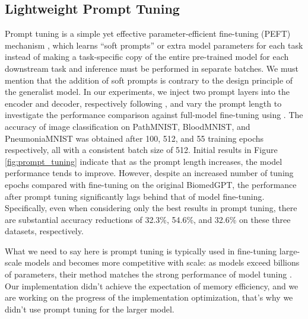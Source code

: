 \documentclass[10pt]{article} \usepackage[preprint]{tmlr}
\begin{document}
\subsection{Lightweight Prompt Tuning} \label{sec:prompt_tuning}
Prompt tuning \citep{lester2021power} is a simple yet effective parameter-efficient fine-tuning (PEFT) mechanism \citep{chen2023parameterefficient}, which learns ``soft prompts'' or extra model parameters for each task instead of making a task-specific copy of the entire pre-trained model for each downstream task and inference must be performed in separate batches. We must mention that the addition of soft prompts is contrary to the design principle of the generalist model. In our experiments, we inject two prompt layers into the encoder and decoder, respectively following \citep{yang2022prompt}, and vary the prompt length  to investigate the performance comparison against full-model fine-tuning using .  
The accuracy of image classification on PathMNIST, BloodMNIST, and PneumoniaMNIST was obtained after 100, 512, and 55 training epochs respectively, all with a consistent batch size of 512. Initial results in Figure \ref{fig:prompt_tuning} indicate that as the prompt length increases, the model performance tends to improve. However, despite an increased number of tuning epochs compared with fine-tuning on the original BiomedGPT, the performance after prompt tuning significantly lags behind that of model fine-tuning. Specifically, even when considering only the best results in prompt tuning, there are substantial accuracy reductions of 32.3\%, 54.6\%, and 32.6\% on these three datasets, respectively.

What we need to say here is prompt tuning is typically used in fine-tuning large-scale models and becomes more competitive with scale: as models exceed billions of parameters, their method matches the strong performance of model tuning \citep{lester2021power}. Our implementation didn't achieve the expectation of memory efficiency, and we are working on the progress of the implementation optimization, that's why we didn't use prompt tuning for the larger model.
\end{document}
